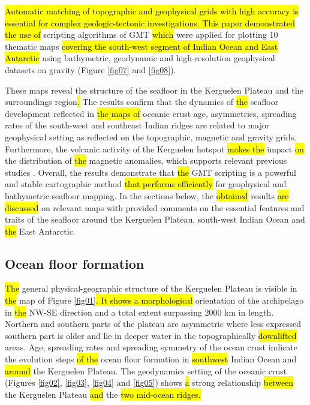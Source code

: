 \documentclass[geomatics,article,submit,pdftex,moreauthors]{Definitions/mdpi}
\begin{document}
\hl{Automatic matching of topographic and geophysical grids with high accuracy is essential for complex geologic-tectonic investigations. This paper demonstrated the use of }scripting algorithms of GMT \hl{which }were applied for plotting 10 thematic maps \hl{covering the south-west segment of Indian Ocean and East Antarctic} using bathymetric, geodynamic and high-resolution geophysical datasets on gravity (Figure \ref{fig07} and \ref{fig08}). 

These maps reveal the structure of the seafloor in the Kerguelen Plateau and the surroundings region\hl{. }The results confirm that the dynamics of \hl{the }seafloor development reflected in \hl{the maps of }oceanic crust age, asymmetries, spreading rates of the south-west and southeast Indian ridges are related to major geophysical setting as reflected on the topographic, magnetic and gravity grids. Furthermore, the volcanic activity of the Kerguelen hotspot \hl{makes the} impact \hl{on }the distribution of \hl{the }magnetic anomalies, which supports relevant previous studies \cite{Fanjat,Weissel,Jokat}. Overall, the results demonstrate that \hl{the }GMT scripting is a powerful and stable cartographic method \hl{that performs efficiently }for geophysical and bathymetric seafloor mapping. In the sections below,\hl{ }the \hl{obtained }results \hl{are discussed }on relevant maps with provided comments on the essential features and traits of the seafloor around the Kerguelen Plateau, south-west Indian Ocean and \hl{the }East Antarctic. 

\subsection{Ocean floor formation}

\hl{The} general physical-geographic structure of the Kerguelen Plateau is visible in \hl{the} map of Figure \ref{fig01}\hl{. It shows a morphological} orientation of the archipelago in \hl{the }NW-SE\hl{ }direction and a total extent surpassing 2000 km in length. Northern and southern parts of the plateau are asymmetric where less expressed southern part is older and lie in deeper water in the topographically \hl{downlifted} areas. Age, spreading rates and spreading symmetry of the ocean crust indicate the evolution steps \hl{of the} ocean floor formation in \hl{southwest} Indian Ocean and \hl{around }the Kerguelen Plateau. The geodynamics setting of the oceanic crust (Figures \ref{fig02}, \ref{fig03}, \ref{fig04} and \ref{fig05}) shows \hl{a} strong relationship \hl{between} the Kerguelen Plateau \hl{and} the \hl{two mid-ocean ridges.} 
\end{document}
